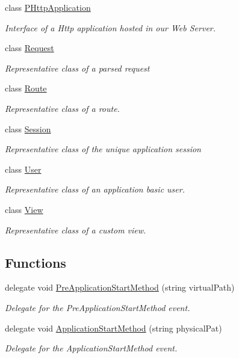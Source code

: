 \begin{DoxyCompactItemize}
class \hyperlink{class_mvc_1_1_p_http_application}{P\+Http\+Application}
\begin{DoxyCompactList}\small\item\em Interface of a Http application hosted in our Web Server. \end{DoxyCompactList}\item 
class \hyperlink{class_mvc_1_1_request}{Request}
\begin{DoxyCompactList}\small\item\em Representative class of a parsed request \end{DoxyCompactList}\item 
class \hyperlink{class_mvc_1_1_route}{Route}
\begin{DoxyCompactList}\small\item\em Representative class of a route. \end{DoxyCompactList}\item 
class \hyperlink{class_mvc_1_1_session}{Session}
\begin{DoxyCompactList}\small\item\em Representative class of the unique application session \end{DoxyCompactList}\item 
class \hyperlink{class_mvc_1_1_user}{User}
\begin{DoxyCompactList}\small\item\em Representative class of an application basic user. \end{DoxyCompactList}\item 
class \hyperlink{class_mvc_1_1_view}{View}
\begin{DoxyCompactList}\small\item\em Representative class of a custom view. \end{DoxyCompactList}\end{DoxyCompactItemize}
\subsection*{Functions}
\begin{DoxyCompactItemize}
\item 
delegate void \hyperlink{namespace_mvc_a3f7bbc102300a4bf8919106a8539057f}{Pre\+Application\+Start\+Method} (string virtual\+Path)
\begin{DoxyCompactList}\small\item\em Delegate for the Pre\+Application\+Start\+Method event.\end{DoxyCompactList}\item 
delegate void \hyperlink{namespace_mvc_ad1473305b15fdb8ed6ec3ad893e1c32f}{Application\+Start\+Method} (string physical\+Pat)
\begin{DoxyCompactList}\small\item\em Delegate for the Application\+Start\+Method event.\end{DoxyCompactList}\end{DoxyCompactItemize}


